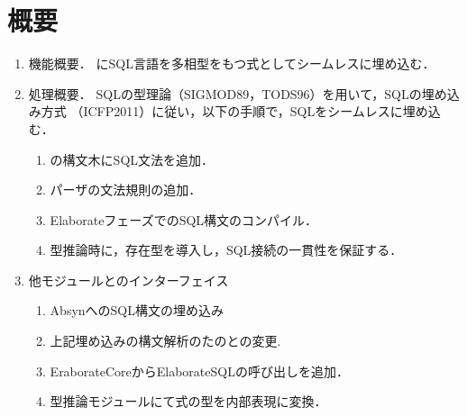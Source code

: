 \section{概要}
\begin{enumerate}
\item 機能概要．
	\smlsharp{}にSQL言語を多相型をもつ式としてシームレスに埋め込む．
\item 処理概要．
	SQLの型理論（SIGMOD89，TODS96）を用いて，SQLの埋め込み方式
（ICFP2011）に従い，以下の手順で，SQLをシームレスに埋め込む．
\begin{enumerate}
\item \smlsharp{}の構文木にSQL文法を追加．
\item パーザの文法規則の追加．
\item ElaborateフェーズでのSQL構文のコンパイル．
\item 型推論時に，存在型を導入し，SQL接続の一貫性を保証する．
\end{enumerate}
\item 他モジュールとのインターフェイス
\begin{enumerate}
\item AbsynへのSQL構文の埋め込み
\item 上記埋め込みの構文解析のたのとの変更.
\item EraborateCoreからElaborateSQLの呼び出しを追加．
\item 型推論モジュールにて式の型を内部表現に変換．
\end{enumerate}
\end{enumerate}

